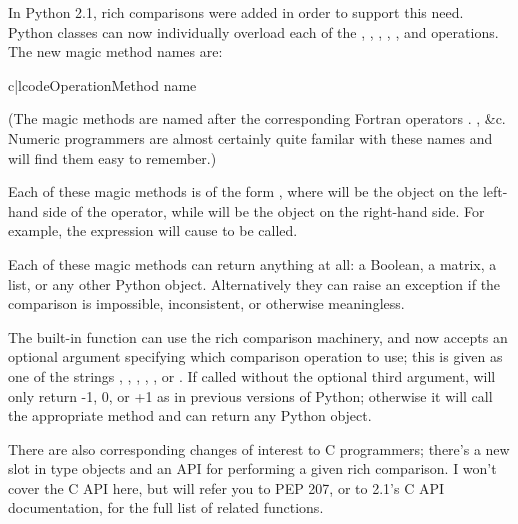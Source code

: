 \documentclass{howto}
\begin{document}
In Python 2.1, rich comparisons were added in order to support this
need.  Python classes can now individually overload each of the
\code{<}, \code{<=}, \code{>}, \code{>=}, \code{==}, and \code{!=}
operations.  The new magic method names are:

\begin{tableii}{c|l}{code}{Operation}{Method name}
   
   
   
  \end{tableii}

(The magic methods are named after the corresponding Fortran operators
. , \&c.  Numeric programmers are almost
certainly quite familar with these names and will find them easy to
remember.)
 
Each of these magic methods is of the form , where  will be the object on the left-hand side of
the operator, while  will be the object on the right-hand
side.  For example, the expression  will cause
 to be called.

Each of these magic methods can return anything at all: a Boolean, a
matrix, a list, or any other Python object.  Alternatively they can
raise an exception if the comparison is impossible, inconsistent, or
otherwise meaningless.

The built-in  function can use the rich comparison
machinery, and now accepts an optional argument specifying which
comparison operation to use; this is given as one of the strings
, , , , , or
.  If called without the optional third argument,
 will only return -1, 0, or +1 as in previous versions
of Python; otherwise it will call the appropriate method and can
return any Python object.

There are also corresponding changes of interest to C programmers;
there's a new slot  in type objects and an API for
performing a given rich comparison.  I won't cover the C API here, but
will refer you to PEP 207, or to 2.1's C API documentation, for the
full list of related functions.

\begin{seealso}


\end{seealso}
\end{document}
